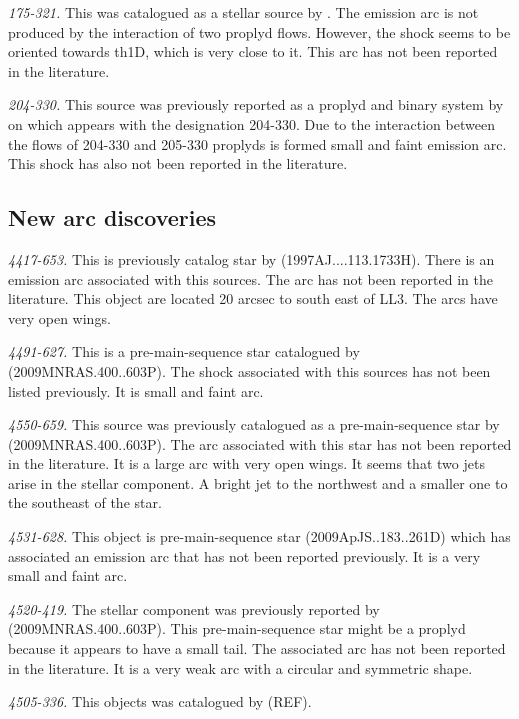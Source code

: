 \documentclass[iop, apj]{emulateapj}
\renewcommand\clearpage{}
\begin{document}
\textit{175-321.} This was catalogued as a stellar source by \citet{ODell:1996a}. The emission arc is not produced by the interaction of two proplyd flows. However, the shock seems to be oriented towards th1D, which is very close to it. This arc has not been reported in the literature.

\textit{204-330.} This source was previously reported as a proplyd and binary system by \citet{Ricci:2008a} on which appears with the designation 204-330.  Due to the interaction between the flows of 204-330 and 205-330 proplyds is formed small and faint emission arc. This shock has also not been reported in the literature.

\clearpage
\subsection{New arc discoveries}
\label{sec:new}

\textit{4417-653.} This is previously catalog star by (1997AJ....113.1733H). There is an emission arc associated with this sources. The arc has not been reported in the literature. This object are located 20 arcsec to south east of LL3. The arcs have very open wings.  

\textit{4491-627.} This is a pre-main-sequence star catalogued by (2009MNRAS.400..603P). The shock associated with this sources has not been listed previously. It is small and faint arc.

\textit{4550-659.} This source was previously catalogued as a pre-main-sequence star by (2009MNRAS.400..603P). The arc associated with this star has not been reported in the literature. It is a large arc with very open wings. It seems that two jets arise in the stellar component. A bright jet to the northwest and a smaller one to the southeast of the star.  

\textit{4531-628.} This object is pre-main-sequence star (2009ApJS..183..261D) which has associated an emission arc that has not been reported previously. It is a very small and faint arc.

\textit{4520-419.} The stellar component was previously reported by (2009MNRAS.400..603P). This pre-main-sequence star might be a proplyd because it appears to have a small tail. The associated arc has not been reported in the literature. It is a very weak arc with a circular and symmetric shape. 

\textit{4505-336.} This objects was catalogued by (REF).  
\end{document}
